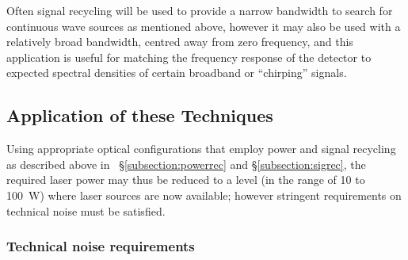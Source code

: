 \documentclass{article}
\begin{document}
Often signal recycling will be used to provide a narrow bandwidth to search for
continuous wave sources as mentioned above, however it may also be used with a
relatively broad bandwidth, centred away from zero frequency, and this
application is useful for matching the frequency response of the detector to
expected spectral densities of certain broadband or ``chirping'' signals.



\subsection{Application of these Techniques}
\label{subsection:application}

Using appropriate optical configurations that employ power and signal recycling
as described above in ~\S\ref{subsection:powerrec} and
\S\ref{subsection:sigrec}, the required laser power may thus be reduced
to a level (in the range of 10 to 100~W) where laser sources are now available;
however stringent requirements on technical noise must be satisfied.


\subsubsection{Technical noise requirements}
\label{subsubsection:lasernoise}
\end{document}
